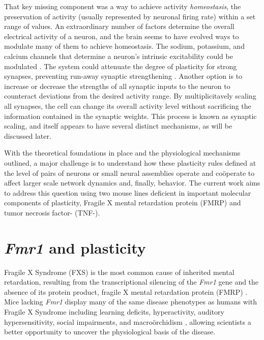 That key missing component was a way to achieve activity \textit{homeostasis}, the preservation of activity (usually represented by neuronal firing rate) within a set range of values. An extraordinary number of factors determine the overall electrical activity of a neuron, and the brain seems to have evolved ways to modulate many of them to achieve homeostasis. The sodium, potassium, and calcium channels that determine a neuron's intrinsic excitability could be modulated \cite{Franklin1992}. The system could attenuate the degree of plasticity for strong synapses, preventing run-away synaptic strengthening \cite{VanRossum2000}. Another option is to increase or decrease the strengths of all synaptic inputs to the neuron to counteract deviations from the desired activity range. By multiplicitavely scaling all synapses, the cell can change its overall activity level without sacrificing the information contained in the synaptic weights. This process is known as synaptic scaling, and itself appears to have several distinct mechanisms, as will be discussed later.

With the theoretical foundations in place and the physiological mechanisms outlined, a major challenge is to understand how these plasticity rules defined at the level of pairs of neurons or small neural assemblies operate and co\"operate to affect larger scale network dynamics and, finally, behavior. The current work aims to address this question using two mouse lines deficient in important molecular components of plasticity, Fragile X mental retardation protein (FMRP) and tumor necrosis factor-\textalpha{} (TNF-\textalpha{}).

\section{\textit{Fmr1} and plasticity}

Fragile X Syndrome (FXS) is the most common cause of inherited mental retardation, resulting from the transcriptional silencing of the \textit{Fmr1} gene and the absence of its protein product, fragile X mental retardation protein (FMRP) \cite{Bailey1998, Jin2003}. Mice lacking \textit{Fmr1} display many of the same disease phenotypes as humans with Fragile X Syndrome including learning deficits, hyperactivity, auditory hypersensitivity, social impairments, and macro\"orchidism \cite{DutchBelgianFragileXConsortium1994, Bernardet2006, Moy2008}, allowing scientists a better opportunity to uncover the physiological basis of the disease.

